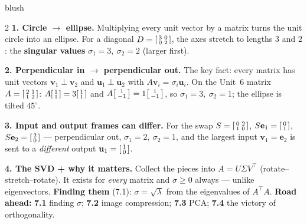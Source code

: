 \documentclass[10pt]{article}
\newcommand{\uu}{\mathbf{u}}
\newcommand{\vv}{\mathbf{v}}
\newcommand{\ee}{\mathbf{e}}
\newcommand{\T}{^{\top}}
\begin{document}
\begin{skillbox}[Lesson]{blush}
\begin{multicols}{2}
\textbf{1. Circle $\to$ ellipse.} Multiplying every unit vector by a matrix turns the unit circle into an
ellipse. For a diagonal $D=\begin{bsmallmatrix} 3 & 0\\ 0 & 2 \end{bsmallmatrix}$, the axes stretch to
lengths $3$ and $2$: the \textbf{singular values} $\sigma_1=3,\ \sigma_2=2$ (larger first).

\textbf{2. Perpendicular in $\to$ perpendicular out.} The key fact: every matrix has unit vectors
$\vv_1\perp\vv_2$ and $\uu_1\perp\uu_2$ with $A\vv_i=\sigma_i\uu_i$. On the Unit~6 matrix
$A=\begin{bsmallmatrix} 2 & 1\\ 1 & 2 \end{bsmallmatrix}$: $A\begin{bsmallmatrix} 1\\1 \end{bsmallmatrix}=
3\begin{bsmallmatrix} 1\\1 \end{bsmallmatrix}$ and $A\begin{bsmallmatrix} 1\\-1 \end{bsmallmatrix}=
1\begin{bsmallmatrix} 1\\-1 \end{bsmallmatrix}$, so $\sigma_1=3,\ \sigma_2=1$; the ellipse is tilted $45^\circ$.

\columnbreak

\textbf{3. Input and output frames can differ.} For the swap $S=\begin{bsmallmatrix} 0 & 2\\ 1 & 0
\end{bsmallmatrix}$, $S\ee_1=\begin{bsmallmatrix} 0\\1 \end{bsmallmatrix}$, $S\ee_2=\begin{bsmallmatrix} 2\\0
\end{bsmallmatrix}$ --- perpendicular out, $\sigma_1=2,\ \sigma_2=1$, and the largest input $\vv_1=\ee_2$ is
sent to a \emph{different} output $\uu_1=\begin{bsmallmatrix} 1\\0 \end{bsmallmatrix}$.

\textbf{4. The SVD + why it matters.} Collect the pieces into $A=U\Sigma V\T$ (rotate--stretch--rotate).
It exists for \emph{every} matrix and $\sigma\ge0$ always --- unlike eigenvectors. \textbf{Finding them}
(7.1): $\sigma=\sqrt{\lambda}$ from the eigenvalues of $A\T A$. \textbf{Road ahead:} \textbf{7.1} finding
$\sigma$; \textbf{7.2} image compression; \textbf{7.3} PCA; \textbf{7.4} the victory of orthogonality.
\end{multicols}
\end{skillbox}
\end{document}
